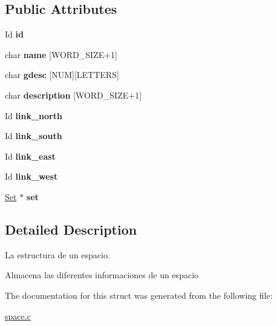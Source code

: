 \subsection*{Public Attributes}
\begin{DoxyCompactItemize}
\item 
\mbox{\label{struct__Space_a70cb461deb9ac073e401b607339b567f}} 
Id {\bfseries id}
\item 
\mbox{\label{struct__Space_aa1c9c994c2d16ecf3ef46138685fdfdc}} 
char {\bfseries name} \mbox{[}W\+O\+R\+D\+\_\+\+S\+I\+ZE+1\mbox{]}
\item 
\mbox{\label{struct__Space_a70cd6d784686e031edfac122e8c2423a}} 
char {\bfseries gdesc} \mbox{[}N\+UM\mbox{]}\mbox{[}L\+E\+T\+T\+E\+RS\mbox{]}
\item 
\mbox{\label{struct__Space_a41a1dbfab1d88b732db50d7335c2f328}} 
char {\bfseries description} \mbox{[}W\+O\+R\+D\+\_\+\+S\+I\+ZE+1\mbox{]}
\item 
\mbox{\label{struct__Space_a7bde74edcf25e78ca0ba6cb557f52060}} 
Id {\bfseries link\+\_\+north}
\item 
\mbox{\label{struct__Space_afab81f1cfceee17fc8d68dca5ee06660}} 
Id {\bfseries link\+\_\+south}
\item 
\mbox{\label{struct__Space_ac73005b97eb7047867d68348b230b8d4}} 
Id {\bfseries link\+\_\+east}
\item 
\mbox{\label{struct__Space_ac0eda3ae0a3b54f8634d9d934dc160db}} 
Id {\bfseries link\+\_\+west}
\item 
\mbox{\label{struct__Space_a115dbdeddf8b1e12889b4ab99945995d}} 
\hyperlink{set_8h_a6d3b7f7c92cbb4577ef3ef7ddbf93161}{Set} $\ast$ {\bfseries set}
\end{DoxyCompactItemize}


\subsection{Detailed Description}
La estructura de un espacio. 

Almacena las diferentes informaciones de un espacio 

The documentation for this struct was generated from the following file\+:\begin{DoxyCompactItemize}
\item 
\hyperlink{space_8c}{space.\+c}\end{DoxyCompactItemize}
